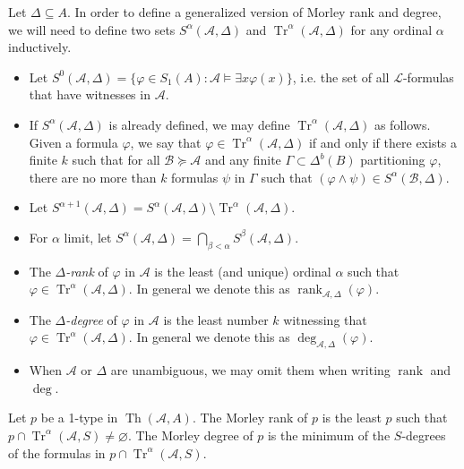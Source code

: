 \documentclass{article}
\DeclareMathOperator{\Th}{Th}
\DeclareMathOperator{\Tr}{Tr}
\DeclareMathOperator{\rank}{rank}
\let\mc\mathcal
\begin{document}
\begin{definition}
    Let $\Delta \subseteq A$. In order to define a generalized version of Morley rank and degree, we will need to define two sets $S^{\alpha}(\mc{A}, \Delta)$ and $\Tr^{\alpha}(\mc{A}, \Delta)$ for any ordinal $\alpha$ inductively.
    \begin{itemize}
        \item Let $S^{0}(\mc{A}, \Delta) = \{ \varphi \in S_1(A) : \mc{A} \vDash \exists x \varphi(x) \}$, i.e. the set of all $\mc{L}$-formulas that have witnesses in $\mc{A}$.

        \item If $S^{\alpha}(\mc{A}, \Delta)$ is already defined, we may define $\Tr^{\alpha}(\mc{A}, \Delta)$ as follows. Given a formula $\varphi$, we say that $\varphi \in \Tr^{\alpha}(\mc{A}, \Delta)$ if and only if there exists a finite $k$ such that for all $\mc{B} \succeq \mc{A}$ and any finite $\Gamma \subset \Delta^{b}(B)$ partitioning $\varphi$, there are no more than $k$ formulas $\psi$ in $\Gamma$ such that $(\varphi \land \psi) \in S^{\alpha}(\mc{B}, \Delta)$.
        
        \item Let $S^{\alpha+1}(\mc{A}, \Delta) = S^{\alpha}(\mc{A}, \Delta) \setminus \Tr^{\alpha}(\mc{A}, \Delta)$.

        \item For $\alpha$ limit, let $S^{\alpha}(\mc{A}, \Delta) = \bigcap_{\beta < \alpha} S^{\beta}(\mc{A}, \Delta)$.

        \item The \textit{$\Delta$-rank} of $\varphi$ in $\mc{A}$ is the least (and unique) ordinal $\alpha$ such that $\varphi \in \Tr^{\alpha}(\mc{A}, \Delta)$. In general we denote this as $\rank_{\mc{A}, \Delta}(\varphi)$.
        
        \item The \textit{$\Delta$-degree} of $\varphi$ in $\mc{A}$ is the least number $k$ witnessing that $\varphi \in \Tr^{\alpha}(\mc{A}, \Delta)$. In general we denote this as $\deg_{\mc{A}, \Delta}(\varphi)$.
        
        \item When $\mc{A}$ or $\Delta$ are unambiguous, we may omit them when writing $\rank$ and $\deg$.
    \end{itemize}
\end{definition}

\begin{proposition}\label{dRank}
    Let $p$ be a 1-type in $\Th(\mc{A}, A)$. The Morley rank of $p$ is the least $p$ such that $p \cap \Tr^{\alpha}(\mc{A}, S) \neq \varnothing$. The Morley degree of $p$ is the minimum of the $S$-degrees of the formulas in $p \cap \Tr^{\alpha}(\mc{A}, S)$.
\end{proposition}
\end{document}
